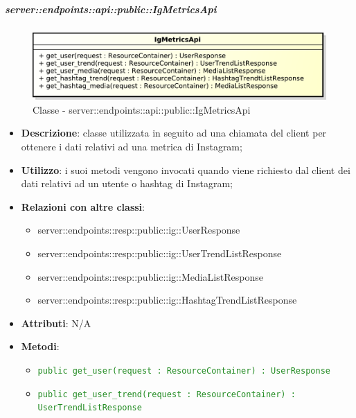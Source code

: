     \subparagraph{server::endpoints::api::public::IgMetricsApi} %
    \label{subp:bdsm_app_server_endpoints_api_public_igmetricsapi}
	\begin{figure}[!htbp]
		\centering
		\centerline{\includegraphics[scale=0.6]{./images/server/classes/endpoints/ig_metrics_api.pdf}}
		\caption{Classe - server::endpoints::api::public::IgMetricsApi}
	\end{figure}
    \begin{itemize}
      \item \textbf{Descrizione}: classe utilizzata in seguito ad una chiamata del client per ottenere i dati relativi ad una metrica di Instagram;
      \item \textbf{Utilizzo}: i suoi metodi vengono invocati quando viene richiesto dal client dei dati relativi ad un utente o hashtag di Instagram;
      \item \textbf{Relazioni con altre classi}:
        \begin{itemize}
          \item server::endpoints::resp::public::ig::UserResponse
          \item server::endpoints::resp::public::ig::UserTrendListResponse
          \item server::endpoints::resp::public::ig::MediaListResponse
          \item server::endpoints::resp::public::ig::HashtagTrendListResponse
        \end{itemize}
		\item \textbf{Attributi}: N/A
		\item \textbf{Metodi}:
			\begin{itemize}
				\item \textcolor{forestgreen}{\texttt{public get\_user(request : ResourceContainer) : UserResponse}}
				\item \textcolor{forestgreen}{\texttt{public get\_user\_trend(request : ResourceContainer) : UserTrendListResponse}}

\end{itemize}
\end{itemize}
